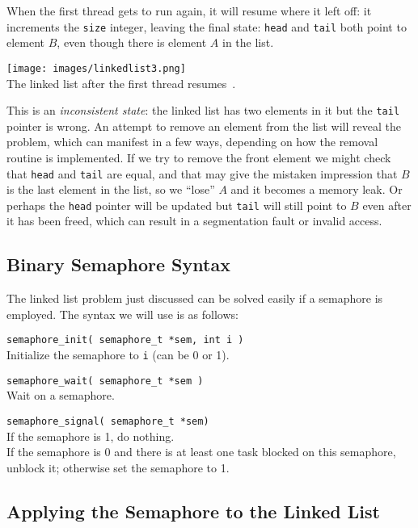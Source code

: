 When the first thread gets to run again, it will resume where it left off: it increments the \texttt{size} integer, leaving the final state: \texttt{head} and \texttt{tail} both point to element $B$, even though there is element $A$ in the list.

\begin{center}
\texttt{[image: images/linkedlist3.png]}\\
The linked list after the first thread resumes~\cite{mte241}.
\end{center}

This is an \textit{inconsistent state}: the linked list has two elements in it but the \texttt{tail} pointer is wrong. An attempt to remove an element from the list will reveal the problem, which can manifest in a few ways, depending on how the removal routine is implemented. If we try to remove the front element we might check that \texttt{head} and \texttt{tail} are equal, and that may give the mistaken impression that $B$ is the last element in the list, so we ``lose'' $A$ and it becomes a memory leak. Or perhaps the \texttt{head} pointer will be updated but \texttt{tail} will still point to $B$ even after it has been freed, which can result in a segmentation fault or invalid access.

\subsection*{Binary Semaphore Syntax}
The linked list problem just discussed can be solved easily if a semaphore is employed. The syntax we will use is as follows:

\texttt{semaphore\_init( semaphore\_t *sem, int i )}\\
Initialize the semaphore to \texttt{i} (can be 0 or 1).

\texttt{semaphore\_wait( semaphore\_t *sem )}\\
Wait on a semaphore.

\texttt{semaphore\_signal( semaphore\_t *sem)}\\
If the semaphore is 1, do nothing.\\
If the semaphore is 0 and there is at least one task blocked on this semaphore, unblock it; otherwise set the semaphore to 1.

\subsection*{Applying the Semaphore to the Linked List}

